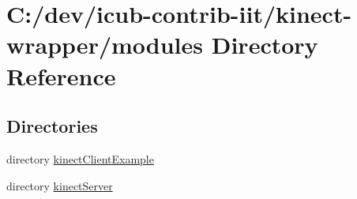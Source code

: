 \section{C\+:/dev/icub-\/contrib-\/iit/kinect-\/wrapper/modules Directory Reference}
\label{dir_e05d7e2b1ecd646af5bb94391405f3b5}
\subsection*{Directories}
\begin{DoxyCompactItemize}
\item 
directory \hyperlink{dir_315e5efb410a16c3dc704eab1dfa1351}{kinect\+Client\+Example}
\item 
directory \hyperlink{dir_65d72078f2cb6a873d9d899efb0a00ca}{kinect\+Server}
\end{DoxyCompactItemize}
